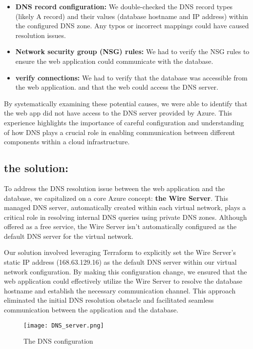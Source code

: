 \begin{itemize}
    \item \textbf{DNS record configuration:} We double-checked the DNS record types (likely A record) and their values (database hostname and IP address) within the configured DNS zone. Any typos or incorrect mappings could have caused resolution issues.
    \item \textbf{Network security group (NSG) rules:} We had to verify the NSG rules to ensure the web application could communicate with the database.
    \item \textbf{verify connections:} We had to verify that the database was accessible from the web application. and that the web could access the DNS server.
\end{itemize}
By systematically examining these potential causes, we were able to identify that the web app did not have access to the DNS server provided by Azure. This experience highlights the importance of careful configuration and understanding of how DNS plays a crucial role in enabling communication between different components within a cloud infrastructure.
\subsection*{the solution:}
To address the DNS resolution issue between the web application and the database, we capitalized on a core Azure concept: \textbf{the Wire Server}. This managed DNS server, automatically created within each virtual network, plays a critical role in resolving internal DNS queries using private DNS zones. Although offered as a free service, the Wire Server isn't automatically configured as the default DNS server for the virtual network.

Our solution involved leveraging Terraform to explicitly set the Wire Server's static IP address (168.63.129.16) as the default DNS server within our virtual network configuration. By making this configuration change, we ensured that the web application could effectively utilize the Wire Server to resolve the database hostname and establish the necessary communication channel. This approach eliminated the initial DNS resolution obstacle and facilitated seamless communication between the application and the database.

\begin{figure}[htpb]
    \centering
    \texttt{[image: DNS\_server.png]}
    \caption{The DNS configuration}
    \label{fig:dns_configuration}
\end{figure}

